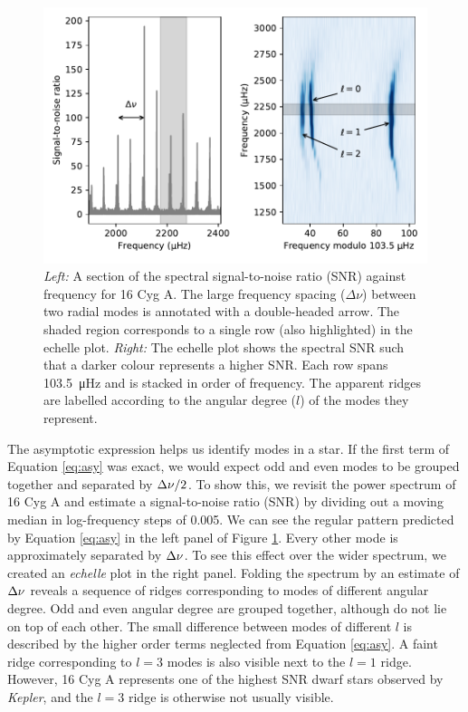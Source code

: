 \begin{figure}[tb]
    \centering
    \includegraphics{figures/seismo-echelle.pdf}
    \caption[Signal-to-noise ratio as a function of frequency and echelle diagram for 16 Cyg A.]{\emph{Left:} A section of the spectral signal-to-noise ratio (SNR) against frequency for 16 Cyg A. The large frequency spacing (\(\Delta\nu\)) between two radial modes is annotated with a double-headed arrow. The shaded region corresponds to a single row (also highlighted) in the echelle plot. \emph{Right:} The echelle plot shows the spectral SNR such that a darker colour represents a higher SNR. Each row spans \SI{103.5}{\micro\hertz} and is stacked in order of frequency. The apparent ridges are labelled according to the angular degree (\(l\)) of the modes they represent.}
    \label{fig:seismo-echelle}
\end{figure}

The asymptotic expression helps us identify modes in a star. If the first term of Equation \ref{eq:asy} was exact, we would expect odd and even modes to be grouped together and separated by \({\Delta\nu}/2\). To show this, we revisit the power spectrum of 16 Cyg A and estimate a signal-to-noise ratio (SNR) by dividing out a moving median in log-frequency steps of \SI{0.005}{\dex}. We can see the regular pattern predicted by Equation \ref{eq:asy} in the left panel of Figure \ref{fig:seismo-echelle}. Every other mode is approximately separated by \({\Delta\nu}\). To see this effect over the wider spectrum, we created an \emph{echelle} plot in the right panel. Folding the spectrum by an estimate of \({\Delta\nu}\) reveals a sequence of ridges corresponding to modes of different angular degree. Odd and even angular degree are grouped together, although do not lie on top of each other. The small difference between modes of different \(l\) is described by the higher order terms neglected from Equation \ref{eq:asy}. A faint ridge corresponding to \(l=3\) modes is also visible next to the \(l=1\) ridge. However, 16 Cyg A represents one of the highest SNR dwarf stars observed by \emph{Kepler}, and the \(l=3\) ridge is otherwise not usually visible. 

